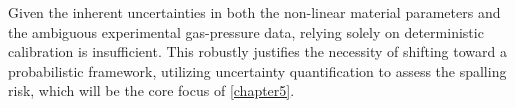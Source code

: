 Given the inherent uncertainties in both the non-linear material parameters and the ambiguous experimental gas-pressure data, relying solely on deterministic calibration is insufficient. This robustly justifies the necessity of shifting toward a probabilistic framework, utilizing uncertainty quantification to assess the spalling risk, which will be the core focus of \cref{chapter5}.